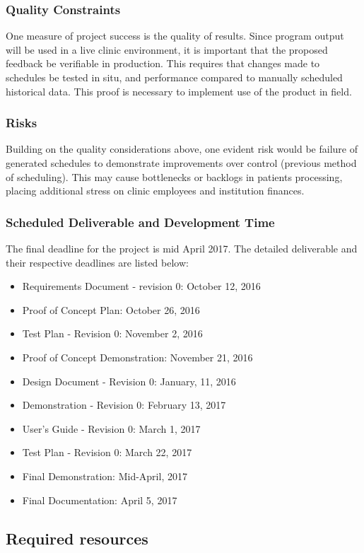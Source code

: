 \documentclass[12pt, titlepage]{article}
\begin{document}
\subsubsection{Quality Constraints}
One measure of project success is the quality of results. Since program output will be used in a live clinic environment, it is important that the proposed feedback be verifiable in production. This requires that changes made to schedules be tested in situ, and performance compared to manually scheduled historical data. This proof is necessary to implement use of the product in field.
\newline\
\subsubsection{Risks}
Building on the quality considerations above, one evident risk would be failure of generated schedules to demonstrate improvements over control (previous method of scheduling). This may cause bottlenecks or backlogs in patients processing, placing additional stress on clinic employees and institution finances. 
\newline\
\subsubsection{Scheduled Deliverable and Development Time}
The final deadline for the project is mid April 2017. The detailed deliverable and their respective deadlines are listed below:
\begin{itemize}
  \item Requirements Document - revision 0: October 12, 2016 
  \item Proof of Concept Plan: October 26, 2016
  \item Test Plan - Revision 0: November 2, 2016
  \item Proof of Concept Demonstration: November 21, 2016
  \item Design Document - Revision 0: January, 11, 2016
  \item Demonstration - Revision 0: February 13, 2017
  \item User’s Guide - Revision 0: March 1, 2017
  \item Test Plan - Revision 0: March 22, 2017
  \item Final Demonstration: Mid-April, 2017
  \item Final Documentation: April 5, 2017
\end{itemize}

\subsection{Required resources}
\end{document}
